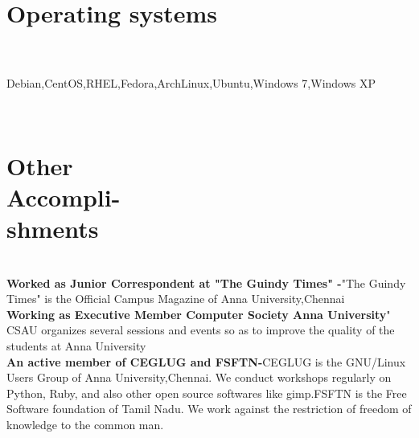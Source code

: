 \documentclass[margin,line]{resume}
\begin{document}
\begin{resume}
    \section{\mysidestyle Operating systems}\\ 
\\ Debian,CentOS,RHEL,Fedora,ArchLinux,Ubuntu,Windows 7,Windows XP 


	 \\\section{\mysidestyle Other\\Accompli-\\shments}\\ 
    \textbf{Worked as Junior Correspondent at "The Guindy Times" -}"The Guindy Times" is the Official Campus Magazine of Anna University,Chennai
    \\\textbf{Working as Executive Member Computer Society Anna University}" CSAU organizes several sessions and events so as to improve the quality of the students at Anna University
\\\textbf{An active member of CEGLUG and FSFTN-}CEGLUG is the GNU/Linux Users Group of Anna University,Chennai. We conduct workshops regularly on Python, Ruby, and also other open source softwares like gimp.FSFTN is the Free Software foundation of Tamil Nadu. We work against the restriction of freedom of knowledge to the common man. 


\end{resume}
\end{document}
